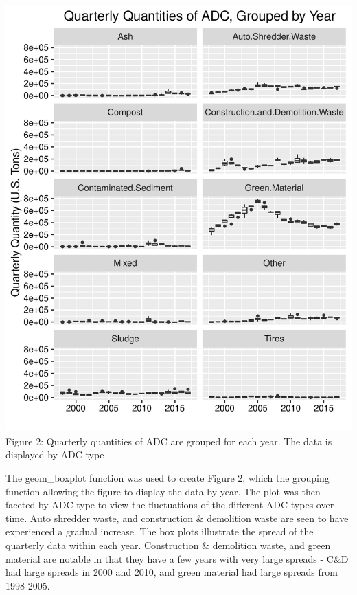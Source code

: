 \documentclass[12pt,]{article}
\begin{document}
\includegraphics{SKo_Project_Template_files/figure-latex/explore_graphs3-1.pdf}
Figure 2: Quarterly quantities of ADC are grouped for each year. The
data is displayed by ADC type

The geom\_boxplot function was used to create Figure 2, which the
grouping function allowing the figure to display the data by year. The
plot was then faceted by ADC type to view the fluctuations of the
different ADC types over time. Auto shredder waste, and construction \&
demolition waste are seen to have experienced a gradual increase. The
box plots illustrate the spread of the quarterly data within each year.
Construction \& demolition waste, and green material are notable in that
they have a few years with very large spreads - C\&D had large spreads
in 2000 and 2010, and green material had large spreads from 1998-2005.
\end{document}

